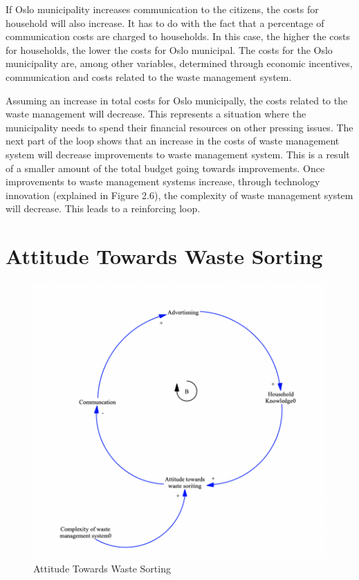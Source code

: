 \indent \newline
If Oslo municipality increases communication to the citizens, the costs for household will also increase. It has to do with the fact that a percentage of communication costs are charged to households. In this case, the higher the costs for households, the lower the costs for Oslo municipal. The costs for the Oslo municipality are, among other variables, determined through economic incentives, communication and costs related to the waste management system.  

\indent \newline
Assuming an increase in total costs for Oslo municipally, the costs related to the waste management will decrease. This represents a situation where the municipality needs to spend their financial resources on other pressing issues. The next part of the loop shows that an increase in the costs of waste management system will decrease improvements to waste management system. This is a result of a smaller amount of the total budget going towards improvements. Once improvements to waste management systems increase, through technology innovation (explained in Figure 2.6), the complexity of waste management system will decrease. This leads to a reinforcing loop. 

\section{Attitude Towards Waste Sorting}

\begin{figure}[H]
\centering
\includegraphics [scale=0.32,angle=360]{figures/attitude.png}
\caption{Attitude Towards Waste Sorting}
\label{fig:attitude}
\end{figure}

